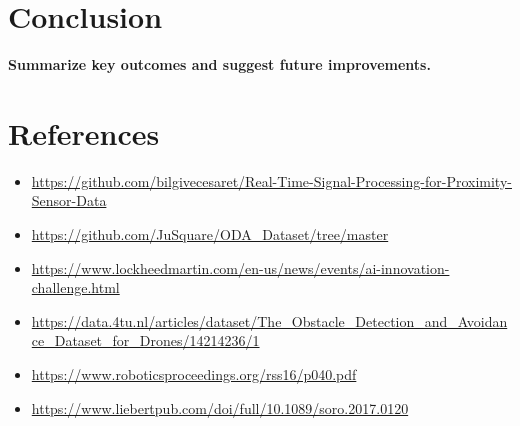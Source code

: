 \documentclass[12pt,a4paper]{article}
\begin{document}
\section{Conclusion}
\textbf{Summarize key outcomes and suggest future improvements.}

\section*{References}
\begin{itemize}
    \item \url{https://github.com/bilgivecesaret/Real-Time-Signal-Processing-for-Proximity-Sensor-Data}
    \item \url{https://github.com/JuSquare/ODA_Dataset/tree/master}
    \item \url{https://www.lockheedmartin.com/en-us/news/events/ai-innovation-challenge.html}
    \item \url{https://data.4tu.nl/articles/dataset/The_Obstacle_Detection_and_Avoidance_Dataset_for_Drones/14214236/1}
    \item  \url{https://www.roboticsproceedings.org/rss16/p040.pdf}
    \item \url{https://www.liebertpub.com/doi/full/10.1089/soro.2017.0120}   
\end{itemize}
\end{document}
